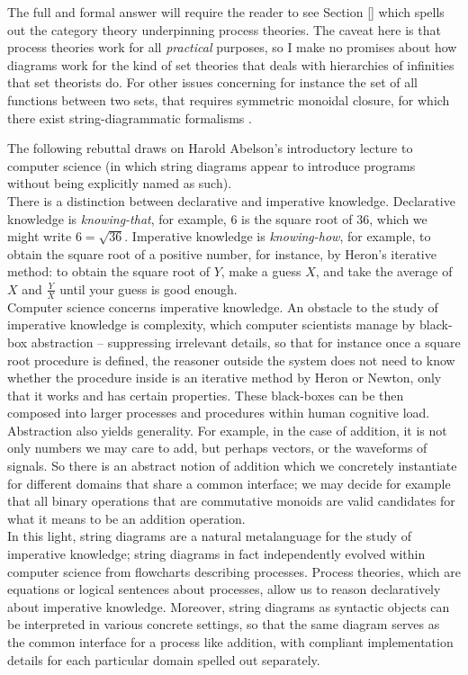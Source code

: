 The full and formal answer will require the reader to see Section \ref{} which spells out the category theory underpinning process theories. The caveat here is that process theories work for all \emph{practical} purposes, so I make no promises about how diagrams work for the kind of set theories that deals with hierarchies of infinities that set theorists do. For other issues concerning for instance the set of all functions between two sets, that requires symmetric monoidal closure, for which there exist string-diagrammatic formalisms \citep{}.


The following rebuttal draws on Harold Abelson's introductory lecture to computer science \citep{} (in which string diagrams appear to introduce programs without being explicitly named as such).\\

There is a distinction between declarative and imperative knowledge. Declarative knowledge is \emph{knowing-that}, for example, 6 is the square root of 36, which we might write $6 = \sqrt{36}$. Imperative knowledge is \emph{knowing-how}, for example, to obtain the square root of a positive number, for instance, by Heron's iterative method: to obtain the square root of $Y$, make a guess $X$, and take the average of $X$ and $\frac{Y}{X}$ until your guess is good enough.\\

Computer science concerns imperative knowledge. An obstacle to the study of imperative knowledge is complexity, which computer scientists manage by black-box abstraction -- suppressing irrelevant details, so that for instance once a square root procedure is defined, the reasoner outside the system does not need to know whether the procedure inside is an iterative method by Heron or Newton, only that it works and has certain properties. These black-boxes can be then composed into larger processes and procedures within human cognitive load.\\

Abstraction also yields generality. For example, in the case of addition, it is not only numbers we may care to add, but perhaps vectors, or the waveforms of signals. So there is an abstract notion of addition which we concretely instantiate for different domains that share a common interface; we may decide for example that all binary operations that are commutative monoids are valid candidates for what it means to be an addition operation.\\

In this light, string diagrams are a natural metalanguage for the study of imperative knowledge; string diagrams in fact independently evolved within computer science from flowcharts describing processes. Process theories, which are equations or logical sentences about processes, allow us to reason declaratively about imperative knowledge. Moreover, string diagrams as syntactic objects can be interpreted in various concrete settings, so that the same diagram serves as the common interface for a process like addition, with compliant implementation details for each particular domain spelled out separately.